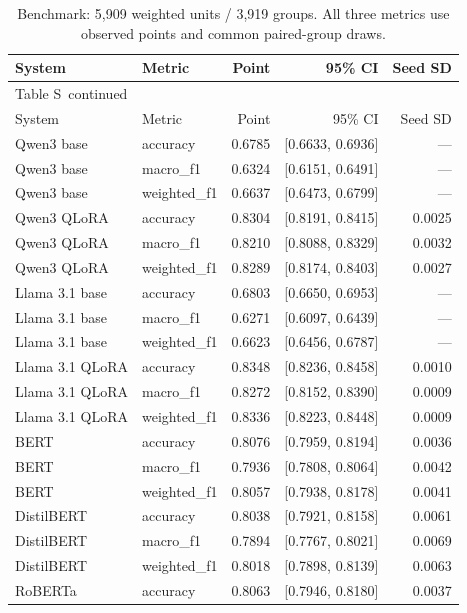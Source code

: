 \documentclass[10pt,a4paper]{article}
\renewcommand{\thetable}{S\arabic{table}}
\begin{document}
{\small
\setlength{\tabcolsep}{4pt}
\begin{longtable}{@{}llrrr@{}}
\caption{Benchmark: 5,909 weighted units / 3,919 groups. All three metrics use observed points and common paired-group draws.}\label{sup:metrics-legacy}\\
\toprule
System & Metric & Point & 95\% CI & Seed SD \\
\midrule\endfirsthead
\multicolumn{5}{l}{\small Table \thetable\ continued}\\
\toprule
System & Metric & Point & 95\% CI & Seed SD \\
\midrule\endhead
\bottomrule\endfoot
Qwen3 base & accuracy & 0.6785 & [0.6633, 0.6936] & --- \\
Qwen3 base & macro\_f1 & 0.6324 & [0.6151, 0.6491] & --- \\
Qwen3 base & weighted\_f1 & 0.6637 & [0.6473, 0.6799] & --- \\
Qwen3 QLoRA & accuracy & 0.8304 & [0.8191, 0.8415] & 0.0025 \\
Qwen3 QLoRA & macro\_f1 & 0.8210 & [0.8088, 0.8329] & 0.0032 \\
Qwen3 QLoRA & weighted\_f1 & 0.8289 & [0.8174, 0.8403] & 0.0027 \\
Llama 3.1 base & accuracy & 0.6803 & [0.6650, 0.6953] & --- \\
Llama 3.1 base & macro\_f1 & 0.6271 & [0.6097, 0.6439] & --- \\
Llama 3.1 base & weighted\_f1 & 0.6623 & [0.6456, 0.6787] & --- \\
Llama 3.1 QLoRA & accuracy & 0.8348 & [0.8236, 0.8458] & 0.0010 \\
Llama 3.1 QLoRA & macro\_f1 & 0.8272 & [0.8152, 0.8390] & 0.0009 \\
Llama 3.1 QLoRA & weighted\_f1 & 0.8336 & [0.8223, 0.8448] & 0.0009 \\
BERT & accuracy & 0.8076 & [0.7959, 0.8194] & 0.0036 \\
BERT & macro\_f1 & 0.7936 & [0.7808, 0.8064] & 0.0042 \\
BERT & weighted\_f1 & 0.8057 & [0.7938, 0.8178] & 0.0041 \\
DistilBERT & accuracy & 0.8038 & [0.7921, 0.8158] & 0.0061 \\
DistilBERT & macro\_f1 & 0.7894 & [0.7767, 0.8021] & 0.0069 \\
DistilBERT & weighted\_f1 & 0.8018 & [0.7898, 0.8139] & 0.0063 \\
RoBERTa & accuracy & 0.8063 & [0.7946, 0.8180] & 0.0037 \\

\end{longtable}}
\end{document}
